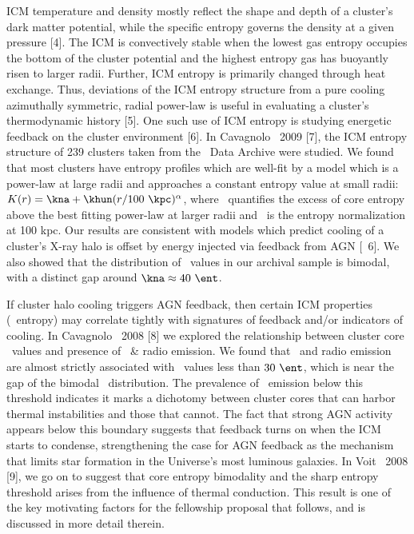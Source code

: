 \documentclass[letterpaper,12pt]{article}
\begin{document}
ICM temperature and density mostly reflect the shape and depth of a
cluster's dark matter potential, while the specific entropy governs
the density at a given pressure [4]. The ICM is convectively stable
when the lowest gas entropy occupies the bottom of the cluster
potential and the highest entropy gas has buoyantly risen to larger
radii. Further, ICM entropy is primarily changed through heat
exchange. Thus, deviations of the ICM entropy structure from a pure
cooling azimuthally symmetric, radial power-law is useful in
evaluating a cluster's thermodynamic history [5]. One such use of ICM
entropy is studying energetic feedback on the cluster environment
[6]. In Cavagnolo \etal\ 2009 [7], the ICM entropy structure of 239
clusters taken from the \chandra\ Data Archive were studied. We found
that most clusters have entropy profiles which are well-fit by a model
which is a power-law at large radii and approaches a constant entropy
value at small radii: $K(r) = \kna + \khun (r/100 ~\kpc)^{\alpha}$,
where \kna\ quantifies the excess of core entropy above the best
fitting power-law at larger radii and \khun\ is the entropy
normalization at 100 kpc. Our results are consistent with models which
predict cooling of a cluster's X-ray halo is offset by energy injected
via feedback from AGN [\eg\ 6]. We also showed that the distribution
of \kna\ values in our archival sample is bimodal, with a distinct gap
around $\kna \approx 40 ~\ent$.

If cluster halo cooling triggers AGN feedback, then certain ICM
properties (\eg\ entropy) may correlate tightly with signatures of
feedback and/or indicators of cooling. In Cavagnolo \etal\ 2008 [8] we
explored the relationship between cluster core \kna\ values and
presence of \halpha\ \& radio emission. We found that \halpha\ and
radio emission are almost strictly associated with \kna\ values less
than $30 ~\ent$, which is near the gap of the bimodal
\kna\ distribution. The prevalence of \halpha\ emission below this
threshold indicates it marks a dichotomy between cluster cores that
can harbor thermal instabilities and those that cannot. The fact that
strong AGN activity appears below this boundary suggests that feedback
turns on when the ICM starts to condense, strengthening the case for
AGN feedback as the mechanism that limits star formation in the
Universe's most luminous galaxies. In Voit \etal\ 2008 [9], we go on
to suggest that core entropy bimodality and the sharp entropy
threshold arises from the influence of thermal conduction. This result
is one of the key motivating factors for the fellowship proposal that
follows, and is discussed in more detail therein.
\end{document}
